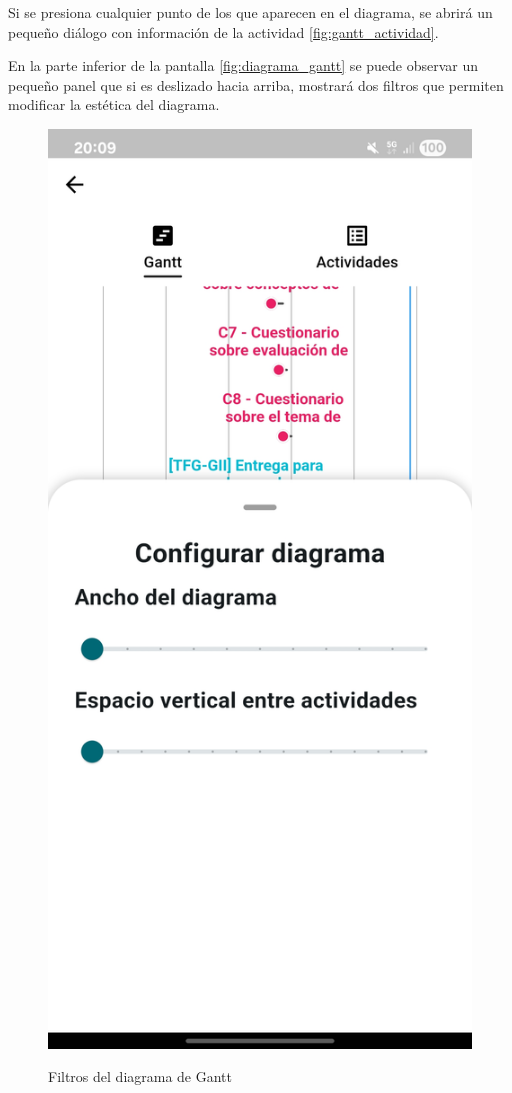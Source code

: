 Si se presiona cualquier punto de los que aparecen en el diagrama, se abrirá un pequeño diálogo con información de la actividad \ref{fig:gantt_actividad}.

En la parte inferior de la pantalla \ref{fig:diagrama_gantt}
se puede observar un pequeño panel que si es deslizado hacia arriba, mostrará dos filtros que permiten modificar la estética del diagrama.
\begin{figure}[H]
  \centering
  \begin{floatrow}
    \ffigbox
      {\includegraphics[width=0.5\linewidth]{img/filtros_diagrama.jpg}}
      {\caption{Filtros del diagrama de Gantt}
      \label{fig:filtros_diagrama}}
    \hfill
    \ffigbox

\end{floatrow}
\end{figure}
